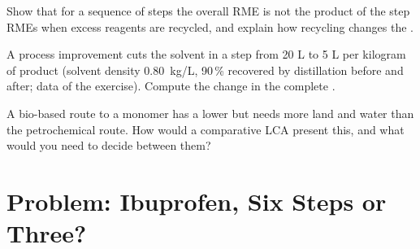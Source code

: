 \begin{exercise}[$\star\star\star$]\label{exo:b3:green-industrial:10}
Show that for a sequence of steps the overall RME is not the product of the step
RMEs when excess reagents are recycled, and explain how recycling changes the
.
\end{exercise}

\begin{exercise}[$\star\star\star$]\label{exo:b3:green-industrial:11}
A process improvement cuts the solvent in a step from 20 L to 5 L per kilogram of
product (solvent density \qty{0.80}{kg/L}, 90\,\% recovered by distillation before and after; data
of the exercise). Compute the change in the complete .
\end{exercise}

\begin{exercise}[$\star\star\star$]\label{exo:b3:green-industrial:12}
A bio-based route to a monomer has a lower  but needs more land
and water than the petrochemical route. How would a comparative LCA present this,
and what would you need to decide between them?
\end{exercise}

\section{Problem: Ibuprofen, Six Steps or Three?}

